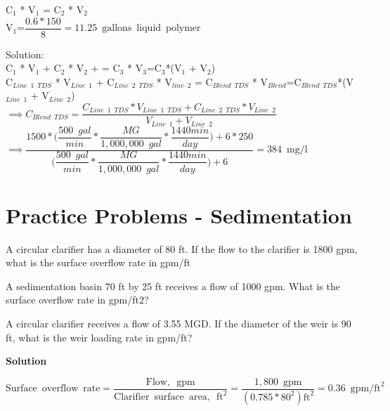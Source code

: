 \vspace{0.2cm}
C$_1$ * V$_1$ = C$_2$ * V$_2$ \\
\vspace{0.2cm}
V$_{1}$=$\dfrac{0.6*150}{8}=\boxed{11.25 \enspace \mathrm{gallons \enspace liquid \enspace polymer}} $\\
\vspace{0.3cm}


Solution:\\
\vspace{0.2cm}
C$_1$ * V$_1$ + C$_2$ * V$_2$ + =  C$_3$ * V$_3$=C$_3$*(V$_1$ + V$_2$)\\
\vspace{0.2cm}
C$_{Line \enspace 1 \enspace TDS} $ * V$_{Line \enspace 1}$ + C$_{Line \enspace 2 \enspace TDS}$ * V$_{line \enspace 2}$ =  C$_{Blend \enspace TDS}$ * V$_{Blend}$=C$_{Blend \enspace TDS}$*(V$_{Line \enspace1}$ + V$_{Line \enspace 2}$)\\
\vspace{0.3cm}
$\implies C_{Blend \enspace TDS}=\dfrac{C_{Line \enspace 1 \enspace TDS} * V_{Line \enspace 1 \enspace TDS} + C_{Line \enspace 2 \enspace TDS} * V_{Line \enspace 2}}{V_{Line \enspace 1} + V_{Line \enspace 2}}$\\
\vspace{0.3cm}
$\implies \dfrac{1500*\Big(\dfrac{500 \enspace gal}{min}*\dfrac{MG}{1,000,000 \enspace gal}*\dfrac{1440 min}{day}\Big)+6*250}{\Big(\dfrac{500 \enspace gal}{min}*\dfrac{MG}{1,000,000 \enspace gal}*\dfrac{1440 min}{day}\Big)+6}=\boxed{384 \enspace \textrm{mg/l}}$



\section*{Practice Problems - Sedimentation}


A circular clarifier has a diameter of 80 ft. If the flow to the clarifier is 1800 gpm, what is the surface overflow rate in gpm/ft

A sedimentation basin 70 ft by 25 ft receives a flow of 1000 gpm. What is the surface overflow rate in gpm/ft$2$?


A circular clarifier receives a flow of 3.55 MGD. If the diameter of the weir is 90 ft, what is the weir loading rate in gpm/ft?


\textbf{Solution}

$\mathrm{Surface \enspace overflow \enspace rate}=\dfrac{\mathrm{Flow, \enspace gpm}}{\mathrm{Clarifier \enspace surface \enspace area, \enspace ft}^2}=\dfrac{1,800 \enspace \mathrm{gpm}}{(0.785*80^2 )\mathrm{ft}^2}=\boxed{0.36 \enspace \mathrm{gpm/ft}^2}$

